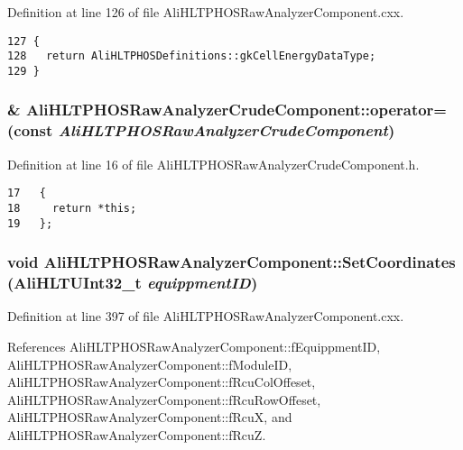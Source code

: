 Definition at line 126 of file Ali\-HLTPHOSRaw\-Analyzer\-Component.cxx.

\footnotesize\begin{verbatim}127 {
128   return AliHLTPHOSDefinitions::gkCellEnergyDataType;
129 }
\end{verbatim}\normalsize 


\subsubsection{\& Ali\-HLTPHOSRaw\-Analyzer\-Crude\-Component::operator= (const  {\em Ali\-HLTPHOSRaw\-Analyzer\-Crude\-Component})\hspace{0.3cm}{\tt  [inline]}}\label{classAliHLTPHOSRawAnalyzerCrudeComponent_AliHLTPHOSRawAnalyzerCrudeComponenta3}




Definition at line 16 of file Ali\-HLTPHOSRaw\-Analyzer\-Crude\-Component.h.

\footnotesize\begin{verbatim}17   {
18     return *this;
19   };
\end{verbatim}\normalsize 


\subsubsection{\setlength{\rightskip}{0pt plus 5cm}void Ali\-HLTPHOSRaw\-Analyzer\-Component::Set\-Coordinates (Ali\-HLTUInt32\_\-t {\em equippment\-ID})\hspace{0.3cm}{\tt  [inherited]}}\label{classAliHLTPHOSRawAnalyzerComponent_AliHLTPHOSRawAnalyzerPeakFinderComponenta12}




Definition at line 397 of file Ali\-HLTPHOSRaw\-Analyzer\-Component.cxx.

References Ali\-HLTPHOSRaw\-Analyzer\-Component::f\-Equippment\-ID, Ali\-HLTPHOSRaw\-Analyzer\-Component::f\-Module\-ID, Ali\-HLTPHOSRaw\-Analyzer\-Component::f\-Rcu\-Col\-Offeset, Ali\-HLTPHOSRaw\-Analyzer\-Component::f\-Rcu\-Row\-Offeset, Ali\-HLTPHOSRaw\-Analyzer\-Component::f\-Rcu\-X, and Ali\-HLTPHOSRaw\-Analyzer\-Component::f\-Rcu\-Z.

